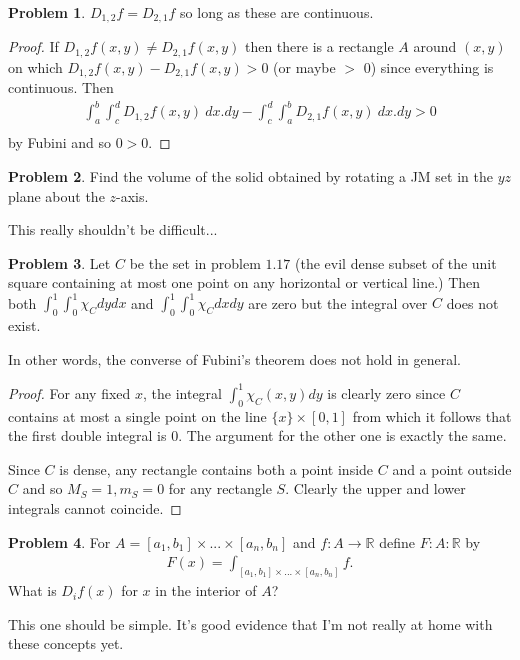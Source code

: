 \documentclass[20pt]{article}
\theoremstyle{plain}
\theoremstyle{definition}
\newtheorem*{problem}{Problem}
\newcommand{\reals}{\mathbb{R}}
\begin{document}
\begin{problem}{3.28}
  $D_{1, 2}f = D_{2, 1}f$ so long as these are continuous.
\end{problem}
\begin{proof}
	If $D_{1, 2}f(x, y) \neq D_{2, 1}f(x, y)$ then there is a rectangle
	$A$ around $(x, y)$ on which $D_{1, 2}f(x, y) - D_{2, 1}f(x, y) > 0$ (or maybe $>$ 0)
	since everything is continuous.  Then
	\begin{align*}
		\int_a^b \int_c^d D_{1, 2} f(x, y)\ dx.dy - \int_c^d \int_a^b D_{2, 1} f(x, y)\ dx.dy > 0 \\
	\end{align*}
	by Fubini and so $0 > 0$.
\end{proof}




\begin{problem}{3.29}
  Find the volume of the solid obtained by rotating a
  JM set in the $yz$ plane about the $z$-axis.
\end{problem}
\color{Blue}
This really shouldn't be difficult...
\color{Black}





\begin{problem}{3.30}
  Let $C$ be the set in problem $1.17$ (the evil dense subset of the unit square
  containing at most one point on any horizontal or vertical line.)
  Then both $\int_0^1 \int_0^1 \chi_C dydx$ and  $\int_0^1 \int_0^1 \chi_C dxdy$
  are zero but the integral over $C$ does not exist.

  In other words, the converse of Fubini's theorem does not hold in general.
\end{problem}

\begin{proof}
  For any fixed $x$, the integral $\int_0^1\chi_C(x, y)dy$ is clearly zero since
  $C$ contains at most a single point on the line $\{x\} \times [0,1]$ from which
  it follows that the first double integral is $0$.  The argument for the other one
  is exactly the same.

  Since $C$ is dense, any rectangle contains both a point inside $C$ and
  a point outside $C$ and so $M_S = 1, m_S = 0$ for any rectangle $S$.
  Clearly the upper and lower integrals cannot coincide.
\end{proof}


\begin{problem}{3.31}
  For $A = [a_1, b_1] \times ...\times [a_n, b_n]$ and $f: A \to \reals$
  define $F: A: \reals$ by
  \begin{align*}
    F(x) = \int_{[a_1, b_1]\times ... \times[a_n, b_n]}f.
  \end{align*}
  What is $D_if(x)$ for $x$ in the interior of $A$?
\end{problem}
\color{Blue}
This one should be simple. It's good evidence that I'm not really at home with these concepts yet.
\color{Black}
\end{document}
